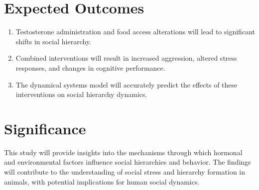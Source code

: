 \documentclass[english, a4paper, 11pt]{article}
\begin{document}
\section*{Expected Outcomes}
\begin{enumerate}
    \item Testosterone administration and food access alterations will lead to significant shifts in social hierarchy.
    \item Combined interventions will result in increased aggression, altered stress responses, and changes in cognitive performance.
    \item The dynamical systems model will accurately predict the effects of these interventions on social hierarchy dynamics.
\end{enumerate}

\section*{Significance}
This study will provide insights into the mechanisms through which hormonal and environmental factors influence social hierarchies and behavior. The findings will contribute to the understanding of social stress and hierarchy formation in animals, with potential implications for human social dynamics.
\end{document}
